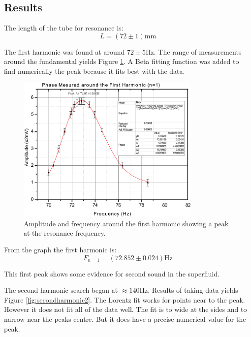 \subsection{Results}
The length of the tube for resonance is:
\begin{equation}
\boxed{ L = (72 \pm 1)\text{mm} }
\end{equation}

The first harmonic was found at around $72\pm5$Hz. 
The range of measurements around the fundamental yields Figure \ref{fig:firstharmonic}.
A Beta fitting function was added to find numerically the peak because it fits best with
the data. 
 
\begin{figure}[htb]
\centering
\includegraphics[width=0.8\textwidth]{pics/firstharmonic.pdf}
\caption{Amplitude and frequency around the first harmonic showing a peak at the resonance frequency. \label{fig:firstharmonic}}
\end{figure}

From the graph the first harmonic is:
\begin{equation}
\boxed{ F_{n=1} = (72.852 \pm 0.024)\text{Hz}}
\end{equation}

This first peak shows some evidence for second sound in the superfluid.

The second harmonic search began at $\approx 140 $Hz.
Results of taking data yields Figure \ref{fig:secondharmonic2}.
The Lorentz fit works for points near to the peak.
However it does not fit all of the data well.
The fit is to wide at the sides and to narrow near the peaks centre.
But it does have a precise numerical value for the peak.

